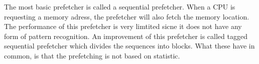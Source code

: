 The most basic prefetcher is called a sequential prefetcher. When a CPU is requesting a memory adress, the prefetcher will also fetch the memory location. The performance of this prefetcher is very limtited sicne it does not have any form of pattern recognition. An improvement of this prefetcher is called tagged sequential prefetcher which divides the sequences into blocks.
	What these have in common, is that the prefetching is not based on statistic. 
